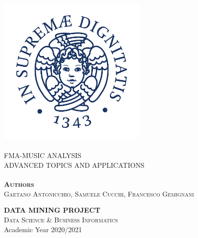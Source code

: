 \begin{titlepage}
\begin{center}

\includegraphics[width=0.55\textwidth]{images/_logo.jpg}~\\[0.5cm]

\HRule \\[0.4cm]
{ \LARGE 
  \LARGE\textsc{FMA-MUSIC ANALYSIS\\ADVANCED TOPICS AND APPLICATIONS}\\[0.4cm]
}
\HRule \\[1.8cm]

{ \Large
  \textsc{\textbf{Authors}}\\[0.2cm]
  \textsc{Gaetano Antonicchio, Samuele Cucchi,
  Francesco Gemignani}\\[0.1cm]
}

\vfill
\textsc{\LARGE \textbf{DATA MINING PROJECT}}\\[0.4cm]
\textsc{\Large Data Science \& Business Informatics }\\[1.0cm]

{\Large Academic Year 2020/2021}
 
\end{center}

\end{titlepage}
